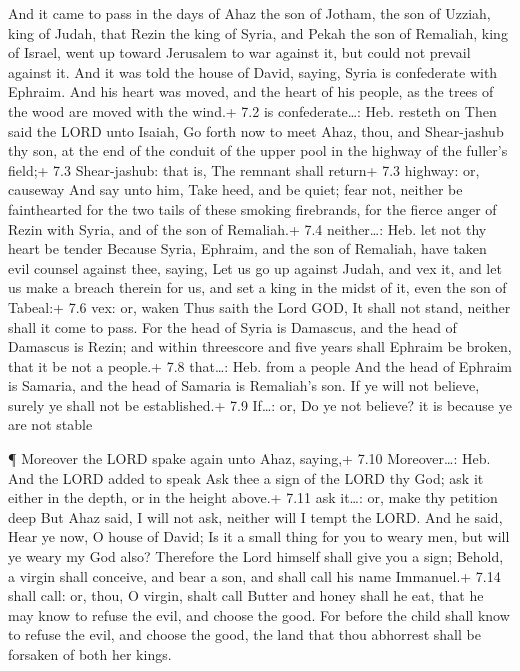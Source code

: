  And it came to pass in the days of Ahaz the son of Jotham,
the son of Uzziah, king of Judah, that Rezin the king of Syria, and
Pekah the son of Remaliah, king of Israel, went up toward Jerusalem to
war against it, but could not prevail against it.  And it
was told the house of David, saying, Syria is confederate with Ephraim.
And his heart was moved, and the heart of his people, as the trees of
the wood are moved with the wind.+ 7.2 is confederate\ldots: Heb.
resteth on  Then said the LORD unto Isaiah, Go forth now to
meet Ahaz, thou, and Shear-jashub thy son, at the end of the conduit of
the upper pool in the highway of the fuller's field;+ 7.3 Shear-jashub:
that is, The remnant shall return+ 7.3 highway: or, causeway
 And say unto him, Take heed, and be quiet; fear not,
neither be fainthearted for the two tails of these smoking firebrands,
for the fierce anger of Rezin with Syria, and of the son of Remaliah.+
7.4 neither\ldots: Heb. let not thy heart be tender  Because
Syria, Ephraim, and the son of Remaliah, have taken evil counsel against
thee, saying,  Let us go up against Judah, and vex it, and
let us make a breach therein for us, and set a king in the midst of it,
even the son of Tabeal:+ 7.6 vex: or, waken  Thus saith the
Lord GOD, It shall not stand, neither shall it come to pass.
 For the head of Syria is Damascus, and the head of Damascus
is Rezin; and within threescore and five years shall Ephraim be broken,
that it be not a people.+ 7.8 that\ldots: Heb. from a people
 And the head of Ephraim is Samaria, and the head of Samaria
is Remaliah's son. If ye will not believe, surely ye shall not be
established.+ 7.9 If\ldots: or, Do ye not believe? it is because ye are
not stable

 ¶ Moreover the LORD spake again unto Ahaz, saying,+ 7.10
Moreover\ldots: Heb. And the LORD added to speak  Ask thee
a sign of the LORD thy God; ask it either in the depth, or in the height
above.+ 7.11 ask it\ldots: or, make thy petition deep  But
Ahaz said, I will not ask, neither will I tempt the LORD. 
And he said, Hear ye now, O house of David; Is it a small thing for you
to weary men, but will ye weary my God also?  Therefore the
Lord himself shall give you a sign; Behold, a virgin shall conceive, and
bear a son, and shall call his name Immanuel.+ 7.14 shall call: or,
thou, O virgin, shalt call  Butter and honey shall he eat,
that he may know to refuse the evil, and choose the good. 
For before the child shall know to refuse the evil, and choose the good,
the land that thou abhorrest shall be forsaken of both her kings.

